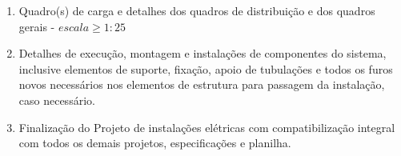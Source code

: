 \begin{enumerate}
	\item Quadro(s) de carga e detalhes dos quadros de distribuição e dos quadros gerais - $escala \geq 1:25$

	\item Detalhes de execução, montagem e instalações de componentes do sistema, inclusive elementos de suporte, fixação, apoio de tubulações e todos os furos novos necessários nos elementos de estrutura para passagem da instalação, caso necessário.

	\item Finalização do Projeto de instalações elétricas com compatibilização integral com todos os demais projetos, especificações e planilha.

	\end{enumerate}